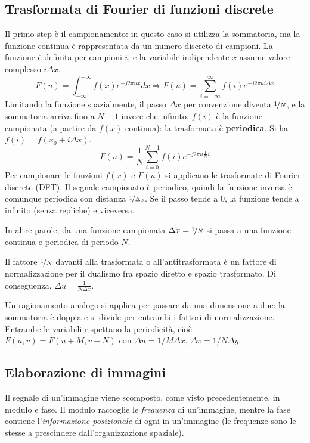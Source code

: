 \subsection{Trasformata di Fourier di funzioni discrete}
Il primo step è il campionamento: in questo caso si utilizza la sommatoria, ma la funzione continua è rappresentata da un numero discreto di campioni. La funzione è definita per campioni $i$, e la variabile indipendente $x$ assume valore complesso $i\Delta x$.
$$F(u) = \int_{-\infty}^{+\infty} f(x)e^{-j2\pi ux} dx \Longrightarrow F(u) = \sum_{i=-\infty}^{\infty} f(i)e^{-j2\pi ui\Delta x}$$
Limitando la funzione spazialmente, il passo $\Delta x$ per convenzione diventa $\nicefrac{1}{N}$, e la sommatoria arriva fino a $N - 1$ invece che infinito. $f(i)$ è la funzione campionata (a partire da $f(x)$ continua): la trasformata è \textbf{periodica}. Si ha $f(i) = f(x_0 + i\Delta x)$.
$$F(u) = \frac{1}{N} \sum_{i=0}^{N-1} f(i)e^{-j2\pi u \frac{1}{N}i}$$
Per campionare le funzioni $f(x)$ e $F(u)$ si applicano le trasformate di Fourier discrete (DFT). Il segnale campionato è periodico, quindi la funzione inversa è comunque periodica con distanza $\nicefrac{1}{\Delta x}$. Se il passo tende a 0, la funzione tende a infinito (senza repliche) e viceversa. 

In altre parole, da una funzione campionata $\Delta x = \nicefrac{1}{N}$ si passa a una funzione continua e periodica di periodo $N$. 

Il fattore $\nicefrac{1}{N}$ davanti alla trasformata o all'antitrasformata è un fattore di normalizzazione per il dualismo fra spazio diretto e spazio trasformato. Di conseguenza, $\Delta u = \frac{1}{N\Delta x}$.

Un ragionamento analogo si applica per passare da una dimensione a due: la sommatoria è doppia e si divide per entrambi i fattori di normalizzazione. Entrambe le variabili rispettano la periodicità, cioè $F(u, v) = F(u + M, v + N)$ con $\Delta u = 1/M \Delta x$, $\Delta v = 1/N \Delta y$.

\subsection{Elaborazione di immagini}
Il segnale di un'immagine viene scomposto, come visto precedentemente, in modulo e fase. Il modulo raccoglie le \textit{frequenza} di un'immagine, mentre la fase contiene l'\textit{informazione posizionale} di ogni in un'immagine (le frequenze sono le stesse a prescindere dall'organizzazione spaziale).

